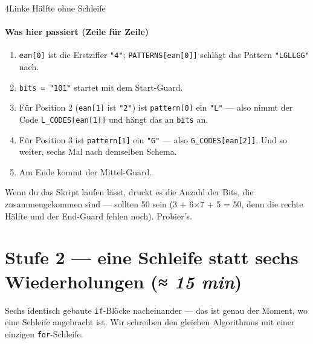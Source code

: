 \begin{pythoneinheit}{4}{Linke Hälfte ohne Schleife}

\paragraph{Was hier passiert (Zeile für Zeile)}
\begin{enumerate}
\item \texttt{ean[0]} ist die Erstziffer \texttt{"4"}; \texttt{PATTERNS[ean[0]]}
  schlägt das Pattern \texttt{"LGLLGG"} nach.
\item \texttt{bits = "101"} startet mit dem Start-Guard.
\item Für Position 2 (\texttt{ean[1]} ist \texttt{"2"}) ist
  \texttt{pattern[0]} ein \texttt{"L"} — also nimmt der Code
  \texttt{L\_CODES[ean[1]]} und hängt das an \texttt{bits} an.
\item Für Position 3 ist \texttt{pattern[1]} ein \texttt{"G"} — also
  \texttt{G\_CODES[ean[2]]}. Und so weiter, sechs Mal nach demselben
  Schema.
\item Am Ende kommt der Mittel-Guard.
\end{enumerate}

Wenn du das Skript laufen lässt, druckt es die Anzahl der Bits, die
zusammengekommen sind — sollten 50 sein
(3 + 6$\times$7 + 5 = 50, denn die rechte Hälfte und der End-Guard
fehlen noch). Probier's.
\end{pythoneinheit}

\section{Stufe 2 — eine Schleife statt sechs Wiederholungen \normalfont(\textit{≈ 15 min})}

Sechs identisch gebaute \texttt{if}-Blöcke nacheinander — das ist
genau der Moment, wo eine Schleife angebracht ist. Wir schreiben den
gleichen Algorithmus mit einer einzigen \texttt{for}-Schleife.

